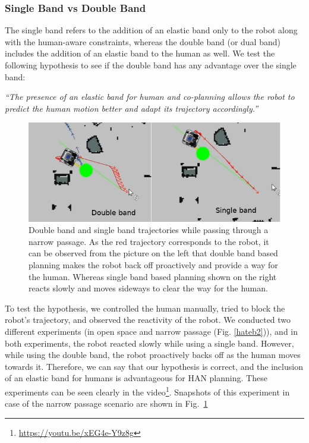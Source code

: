 \subsubsection{Single Band vs Double Band}
The single band refers to the addition of an elastic band only to the robot along with the human-aware constraints, whereas the double band (or dual band) includes the addition of an elastic band to the human as well. We test the following hypothesis to see if the double band has any advantage over the single band: 

\textit{``The  presence of an elastic band for human and co-planning allows the robot to predict the human motion better and adapt its trajectory accordingly.''}

\begin{figure}[!h]
\centering
\includegraphics[width=0.9\columnwidth]{images/chapter3/door_tj.png}
\caption{Double band and single band trajectories while passing through a narrow passage. As the red trajectory corresponds to the robot, it can be observed from the picture on the left that double band based planning makes the robot back off proactively and provide a way for the human. Whereas single band based planning shown on the right reacts slowly and moves sideways to clear the way for the human.}
\label{door_tj_fig}
\end{figure}

To test the hypothesis, we controlled the human manually, tried to block the robot's trajectory, and observed the reactivity of the robot. We conducted two different experiments (in open space and narrow passage (Fig. \ref{hateb2})), and in both experiments, the robot reacted slowly while using a single band. However, while using the double band, the robot proactively backs off as the human moves towards it. Therefore, we can say that our hypothesis is correct,  and the inclusion of an elastic band for humans is advantageous for HAN planning. These experiments can be seen clearly in the video\footnote{\url{https://youtu.be/xEG4e-Y9z8g}\label{vd_ln}}. Snapshots of this experiment in case of the narrow passage scenario are shown in Fig.~\ref{door_tj_fig}


